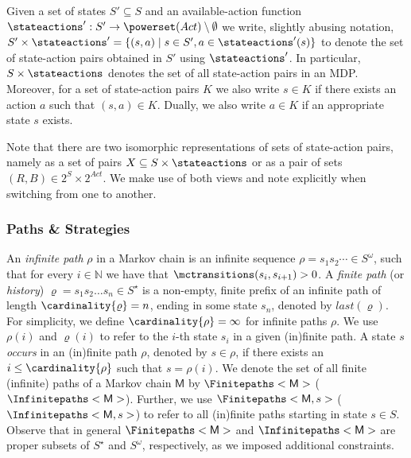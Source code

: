 \documentclass{theoretics}
\newcommand{\Naturals}{\mathbb{N}}
\newcommand{\MC}{\mathsf{M}}
\newcommand{\States}{S}
\newcommand{\Actions}{Act}
\newcommand{\infinitepath}{\rho}
\newcommand{\finitepath}{\varrho}
\newcommand{\last}[1]{last(#1)}
\begin{document}
Given a set of states $\States' \subseteq \States$ and an available-action function $\stateactions' : \States' \to \powerset(\Actions) \setminus \emptyset$ we write, slightly abusing notation, $\States' \times \stateactions' = \{(s, a) \mid s \in \States', a \in \stateactions'(s)\}$ to denote the set of state-action pairs obtained in $\States'$ using $\stateactions'$.
In particular, $\States \times \stateactions$ denotes the set of all state-action pairs in an MDP.
Moreover, for a set of state-action pairs $K$ we also write $s \in K$ if there exists an action $a$ such that $(s, a) \in K$.
Dually, we also write $a \in K$ if an appropriate state $s$ exists.

Note that there are two isomorphic representations of sets of state-action pairs, namely as a set of pairs $X \subseteq \States \times \stateactions$ or as a pair of sets $(R, B) \in 2^\States \times 2^{\Actions}$.
We make use of both views and note explicitly when switching from one to another.

\subsubsection*{Paths \& Strategies}
An \emph{infinite path} $\infinitepath$ in a Markov chain is an infinite sequence $\infinitepath = s_1 s_2 \cdots \in \States^\omega$, such that for every $i \in \Naturals$ we have that $\mctransitions(s_i, s_{i+1}) > 0$.
A \emph{finite path} (or \emph{history}) $\finitepath = s_1 s_2 \dots s_n \in \States^\star$ is a non-empty, finite prefix of an infinite path of length $\cardinality{\finitepath} = n$, ending in some state $s_n$, denoted by $\last{\finitepath}$.
For simplicity, we define $\cardinality{\infinitepath} = \infty$ for infinite paths $\infinitepath$.
We use $\infinitepath(i)$ and $\finitepath(i)$ to refer to the $i$-th state $s_i$ in a given (in)finite path.
A state $s$ \emph{occurs} in an (in)finite path $\infinitepath$, denoted by $s \in \infinitepath$, if there exists an $i \leq \cardinality{\infinitepath}$ such that $s = \infinitepath(i)$.
We denote the set of all finite (infinite) paths of a Markov chain $\MC$ by $\Finitepaths<\MC>$ ($\Infinitepaths<\MC>$).
Further, we use $\Finitepaths<\MC, s>$ ($\Infinitepaths<\MC, s>$) to refer to all (in)finite paths starting in state $s \in \States$.
Observe that in general $\Finitepaths<\MC>$ and $\Infinitepaths<\MC>$ are proper subsets of $\States^\star$ and $\States^\omega$, respectively, as we imposed additional constraints.
\end{document}
